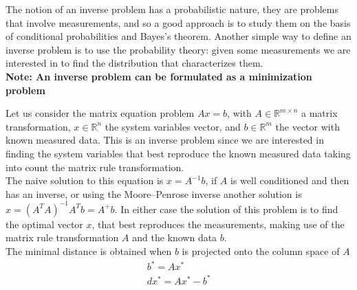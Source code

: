 The notion of an inverse problem has a probabilistic nature, they are problems that involve measurements, and so a good approach is to study them on the basis of conditional probabilities and Bayes’s theorem. Another simple way to define an inverse problem is to use the probability theory: given some measurements we are interested in to find the distribution that characterizes them. \\

\textbf{Note: An inverse problem can be formulated as a minimization problem}

Let us consider the matrix equation problem $Ax=b$, with $A\in \mathbb{R}^{m\times n}$ a matrix transformation, $x\in \mathbb{R}^n$ the system variables vector, and $b\in \mathbb{R}^m$ the vector with known measured data. This is an inverse problem since we are interested in finding the system variables that best reproduce the known measured data taking into count the matrix rule transformation.\\  

The naive solution to this equation is $x=A^{-1}b$, if $A$ is well conditioned and then has an inverse, or using the Moore–Penrose inverse another solution is $x=(A^TA)^{-1}A^Tb=A^+b$. In either case the solution of this problem is to find the optimal vector $x$, that best reproduces the measurements, making use of the matrix rule transformation $A$ and the known data $b$. \\

The minimal distance is obtained when $b$ is projected onto the column space of $A$
\begin{gather*}
    b^*= Ax^*\\
    dx^* = Ax^*-b^*
\end{gather*}


